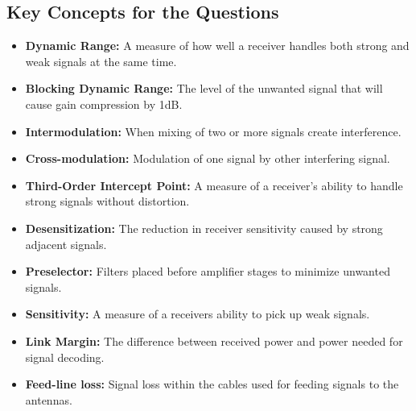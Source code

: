 
\subsection*{Key Concepts for the Questions}
\begin{itemize}
       \item \textbf{Dynamic Range:} A measure of how well a receiver handles both strong and weak signals at the same time.
     \item \textbf{Blocking Dynamic Range:}  The level of the unwanted signal that will cause gain compression by 1dB.
    \item \textbf{Intermodulation:} When mixing of two or more signals create interference.
         \item \textbf{Cross-modulation:} Modulation of one signal by other interfering signal.
    \item \textbf{Third-Order Intercept Point:}  A measure of a receiver's ability to handle strong signals without distortion.
    \item \textbf{Desensitization:} The reduction in receiver sensitivity caused by strong adjacent signals.
    \item \textbf{Preselector:} Filters placed before amplifier stages to minimize unwanted signals.
    \item \textbf{Sensitivity:} A measure of a receivers ability to pick up weak signals.
       \item \textbf{Link Margin:}  The difference between received power and power needed for signal decoding.
       \item \textbf{Feed-line loss:} Signal loss within the cables used for feeding signals to the antennas.

\end{itemize}

